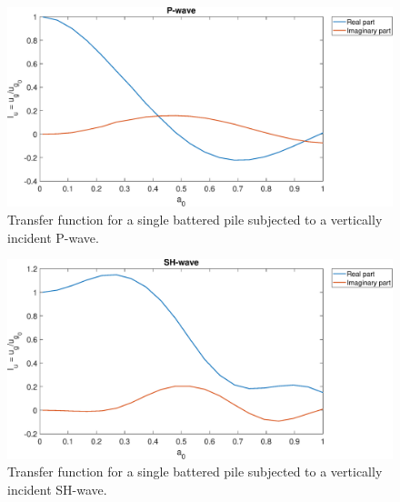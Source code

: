 \documentclass[a4]{article}
\begin{document}
\begin{figure}[tbh!]
	\centering
	\includegraphics[scale=0.5]{p-wave.eps}
	\caption{Transfer function for a single battered pile subjected to a vertically incident P-wave.}
	\label{fig:p-wave}
\end{figure}

\begin{figure}[tbh!]
	\centering
	\includegraphics[scale=0.5]{sh-wave.eps}
	\caption{Transfer function for a single battered pile subjected to a vertically incident SH-wave.}
	\label{fig:sh-wave}
\end{figure}
\end{document}
